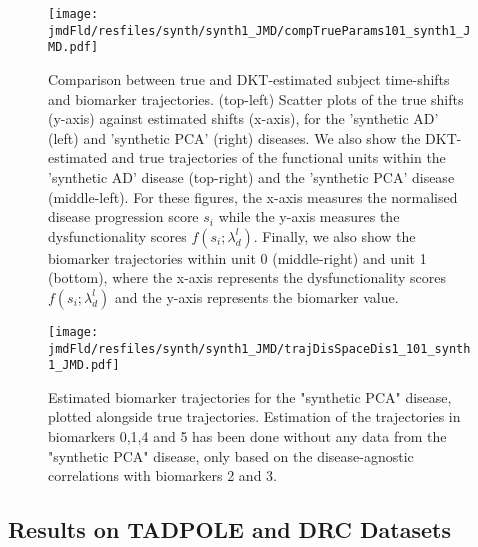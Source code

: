 \begin{figure}
\texttt{[image: \\jmdFld/resfiles/synth/synth1\_JMD/compTrueParams101\_synth1\_JMD.pdf]}
 \caption[DKT Simulation Results - Comparison between true and DKT-estimated biomarker trajectories and subject time-shifts.]{Comparison between true and DKT-estimated subject time-shifts and biomarker trajectories. (top-left) Scatter plots of the true shifts (y-axis) against estimated shifts (x-axis), for the 'synthetic AD' (left) and 'synthetic PCA' (right) diseases. We also show the DKT-estimated and true trajectories of the functional units within the 'synthetic AD' disease (top-right) and the 'synthetic PCA' disease (middle-left). For these figures, the x-axis measures the normalised disease progression score $s_i$ while the y-axis measures the dysfunctionality scores $f(s_i;\lambda_d^l)$. Finally, we also show the biomarker trajectories within unit 0 (middle-right) and unit 1 (bottom), where the x-axis represents the dysfunctionality scores $f(s_i;\lambda_d^l)$ and the y-axis represents the biomarker value.}
 \label{fig:dktSynthTrajCompTrue}
\end{figure}

\begin{figure}
\texttt{[image: \\jmdFld/resfiles/synth/synth1\_JMD/trajDisSpaceDis1\_101\_synth1\_JMD.pdf]}
 \caption[Estimated biomarker trajectories for the "synthetic PCA" disease, plotted alongside true trajectories]{Estimated biomarker trajectories for the "synthetic PCA" disease, plotted alongside true trajectories. Estimation of the trajectories in biomarkers 0,1,4 and 5 has been done without any data from the "synthetic PCA" disease, only based on the disease-agnostic correlations with biomarkers 2 and 3.}
 \label{fig:dktSynthTrajDrcSpace}
\end{figure}


\subsection{Results on TADPOLE and DRC Datasets}
\label{sec:dktResTadDrc}

